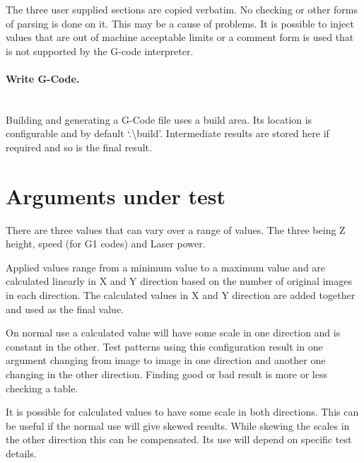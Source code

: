 The three user supplied sections are copied verbatim. No checking or other forms of parsing is done on it.
This may be a cause of problems. It is possible to inject values that are out of machine acceptable limits
or a comment form is used that is not supported by the G-code interpreter.

\WarningCheckAndTest

\paragraph{Write G-Code.}~\\
Building and generating a G-Code file uses a build area. Its location is configurable and by default
`.\textbackslash{}build'. Intermediate results are stored here if required and so is the final result.

\section{Arguments under test}
There are three values that can vary over a range of values.
The three being Z height,
speed (for G1 codes)
and Laser power.

Applied values range from a minimum value to a maximum value and are calculated linearly in X and Y direction
based on the number of original images in each direction. The calculated values in X and Y
direction are added together and used as the final value.

On normal use a calculated value will have some scale in one direction and is constant in the other. Test patterns
using this configuration result in one argument changing from image to image in one direction and another one
changing in the other direction. Finding good or bad result is more or less checking a table.

It is possible for calculated values to have some scale in both directions. This can be useful if the normal use
will give skewed results. While skewing the scales in the other direction this can be compensated. Its use will
depend on specific test details.